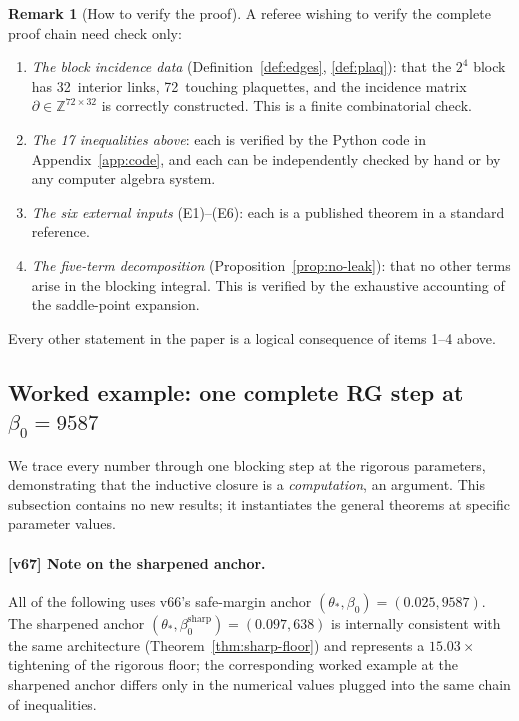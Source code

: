 \documentclass[11pt]{article}
\theoremstyle{definition}
\newtheorem{remark}[theorem]{Remark}
\newcommand{\Z}{\mathbb{Z}}
\begin{document}
\begin{remark}[How to verify the proof]\label{rem:how-to-verify}
A referee wishing to verify the complete proof chain need check
only:
\begin{enumerate}[nosep]
\item \emph{The block incidence data} (Definition~\ref{def:edges},
\ref{def:plaq}): that the $2^4$ block has 32~interior links,
72~touching plaquettes, and the incidence matrix
$\partial\in\Z^{72\times 32}$ is correctly constructed.
This is a finite combinatorial check.
\item \emph{The 17 inequalities above}: each is verified by
the Python code in Appendix~\ref{app:code}, and each can
be independently checked by hand or by any computer algebra
system.
\item \emph{The six external inputs} (E1)--(E6): each is a
published theorem in a standard reference.
\item \emph{The five-term decomposition}
(Proposition~\ref{prop:no-leak}): that no other terms arise
in the blocking integral.  This is verified by the
exhaustive accounting of the saddle-point expansion.
\end{enumerate}
Every other statement in the paper is a logical consequence
of items 1--4 above.
\end{remark}

\subsection{Worked example: one complete RG step at $\beta_0=9587$}%
\label{subsec:worked}

We trace every number through one blocking step at the
rigorous parameters, demonstrating that the inductive
closure is a \emph{computation}, an argument.
This subsection contains no new results; it instantiates
the general theorems at specific parameter values.

\paragraph{[v67] Note on the sharpened anchor.}  All of the
following uses v66's safe-margin anchor $(\theta_*,\beta_0)=(0.025,9587)$.
The sharpened anchor $(\theta_*,\beta_0^{\mathrm{sharp}})=(0.097,638)$
is internally consistent with the same architecture
(Theorem~\ref{thm:sharp-floor}) and represents a $15.03\times$
tightening of the rigorous floor; the corresponding worked example
at the sharpened anchor differs only in the numerical values plugged
into the same chain of inequalities.
\end{document}
